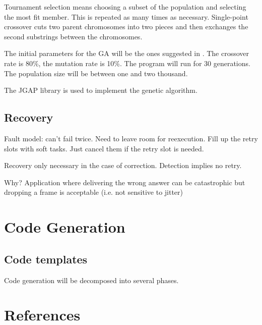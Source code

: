 \documentclass[table,11pt]{article}
\begin{document}
Tournament selection means choosing a subset of the population and selecting the most fit member. This is repeated as many times as necessary. Single-point crossover cuts two parent chromosomes into two pieces and then exchanges the second substrings between the chromosomes. 

The initial parameters for the GA will be the ones suggested in \cite{bolchini2010multi}. The crossover rate is 80\%, the mutation rate is 10\%. The program will run for 30 generations. The population size will be between one and two thousand.

The JGAP library \cite{jgap} is used to implement the genetic algorithm. 

\subsection{Recovery}
Fault model: can't fail twice.
Need to leave room for reexecution. 
Fill up the retry slots with soft tasks. Just cancel them if the retry slot is needed.

Recovery only necessary in the case of correction. Detection implies no retry. 

Why? Application where delivering the wrong answer can be catastrophic but dropping a frame is acceptable (i.e. not sensitive to jitter)



\section{Code Generation}

\subsection{Code templates}

Code generation will be decomposed into several phases.


\section{References}

\begingroup
\renewcommand{\section}[2]{}%


\endgroup
\end{document}
